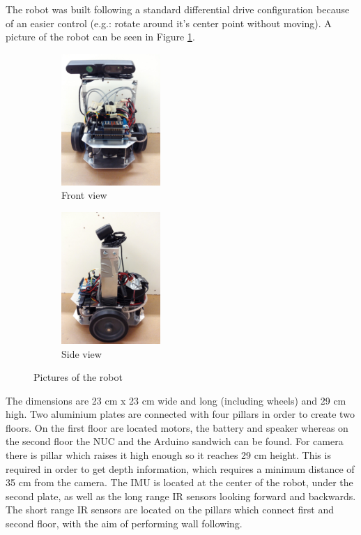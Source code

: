 The robot was built following a standard differential drive configuration \cite{Robotics} because of an easier control (e.g.: rotate around it's center point without moving). A picture of the robot can be seen in Figure \ref{fig:robotPic}.

\begin{figure}[h]
        \centering
        \begin{subfigure}[b]{0.45\linewidth}
        \centering
                \includegraphics[height=5cm]{figures/front.jpg}
		\caption{Front view}
        \end{subfigure}
        \begin{subfigure}[b]{0.45\linewidth}
        \centering
                \includegraphics[height=5cm]{figures/side.jpg}
                \caption{Side view}
        \end{subfigure}
        \caption{Pictures of the robot}
                \label{fig:robotPic}
\end{figure}


The dimensions are 23 cm x 23 cm wide and long (including wheels) and 29 cm high. Two aluminium plates are connected with four pillars in order to create two floors. On the first floor are located motors, the battery and speaker whereas on the second floor the NUC and the Arduino sandwich can be found. For camera there is pillar which raises it high enough so it reaches 29 cm height. This is required in order to get depth information, which requires a minimum distance of 35 cm from the camera. The IMU is located at the center of the robot, under the second plate, as well as the long range IR sensors looking forward and backwards. The short range IR sensors are located on the pillars which connect first and second floor, with the aim of performing wall following. 